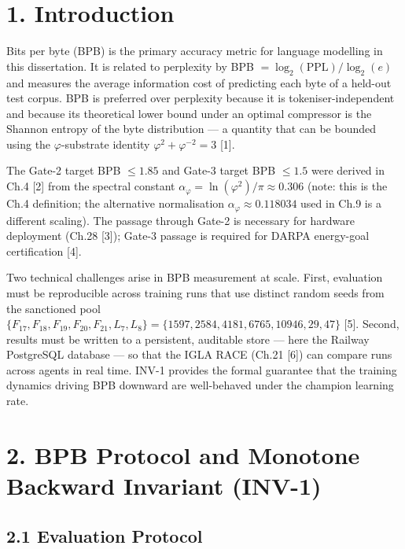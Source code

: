 \section{1. Introduction}\label{fa_15:introduction}

Bits per byte (BPB) is the primary accuracy metric
for language modelling in this dissertation. It is
related to perplexity by BPB
\(= \log_2(\text{PPL}) / \log_2(e)\) and measures
the average information cost of predicting each
byte of a held-out test corpus. BPB is preferred
over perplexity because it is
tokeniser-independent and because its theoretical
lower bound under an optimal compressor is the
Shannon entropy of the byte distribution --- a
quantity that can be bounded using the
\(\varphi\)-substrate identity
\(\varphi^2 + \varphi^{-2} = 3\) [1].

The Gate-2 target BPB \(\leq 1.85\) and Gate-3
target BPB \(\leq 1.5\) were derived in Ch.4
[2] from the spectral constant
\(\alpha_\varphi = \ln(\varphi^2)/\pi \approx 0.306\)
(note: this is the Ch.4 definition; the
alternative normalisation
\(\alpha_\varphi \approx 0.118034\) used in Ch.9
is a different scaling). The passage through
Gate-2 is necessary for hardware deployment (Ch.28
[3]); Gate-3 passage is required for DARPA
energy-goal certification [4].

Two technical challenges arise in BPB measurement
at scale. First, evaluation must be reproducible
across training runs that use distinct random
seeds from the sanctioned pool
\(\{F_{17}, F_{18}, F_{19}, F_{20}, F_{21}, L_7, L_8\} = \{1597, 2584, 4181, 6765, 10946, 29, 47\}\)
[5]. Second, results must be written to a
persistent, auditable store --- here the Railway PostgreSQL database --- so that the IGLA RACE
(Ch.21 [6]) can compare runs across agents in
real time. INV-1 provides the formal guarantee
that the training dynamics driving BPB downward
are well-behaved under the champion learning rate.

\section{2. BPB Protocol and Monotone Backward
Invariant
(INV-1)}\label{fa_15:bpb-protocol-and-monotone-backward-invariant-inv-1}

\subsection{2.1 Evaluation
Protocol}\label{fa_15:evaluation-protocol}

